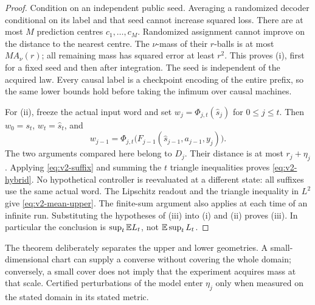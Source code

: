 \begin{proof}
Condition on an independent public seed. Averaging a randomized decoder
conditional on its label and that seed cannot increase squared loss.
There are at most $M$ prediction centres $c_1,\ldots,c_M$. Randomized
assignment cannot improve on the distance to the nearest centre. The
$\nu$-mass of their $r$-balls is at most $MA_\nu(r)$; all remaining mass
has squared error at least $r^2$. This proves (i), first for a fixed seed
and then after integration. The seed is independent of the acquired law.
Every causal label is a checkpoint encoding of the entire prefix, so the
same lower bounds hold before taking the infimum over causal machines.

For (ii), freeze the actual input word and set
$w_j=\Phi_{j,t}(\widehat s_j)$ for $0\le j\le t$. Then $w_0=s_t$,
$w_t=\widehat s_t$, and
\[
 w_{j-1}=\Phi_{j,t}
   \bigl(F_{j-1}(\widehat s_{j-1},a_{j-1},y_j)\bigr).
\]
The two arguments compared here belong to $D_j$. Their distance is at
most $r_j+\eta_j$. Applying \eqref{eq:v2-suffix} and summing the $t$
triangle inequalities proves \eqref{eq:v2-hybrid}. No hypothetical
controller is reevaluated at a different state: all suffixes use the same
actual word. The Lipschitz readout and the triangle inequality in $L^2$
give \eqref{eq:v2-mean-upper}. The finite-sum argument also applies at
each time of an infinite run. Substituting the hypotheses of (iii) into
(i) and (ii) proves (iii). In particular the conclusion is
$\sup_t\mathbb E L_t$, not $\mathbb E\sup_t L_t$.
\end{proof}

The theorem deliberately separates the upper and lower geometries.
A small-dimensional chart can supply a converse without covering the
whole domain; conversely, a small cover does not imply that the experiment
acquires mass at that scale. Certified perturbations of the model enter
$\eta_j$ only when measured on the stated domain in its stated metric.

